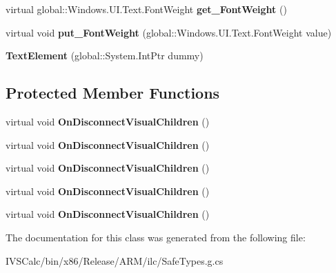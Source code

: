 \begin{DoxyCompactItemize}
virtual global\+::\+Windows.\+U\+I.\+Text.\+Font\+Weight {\bfseries get\+\_\+\+Font\+Weight} ()
\item 
\mbox{\label{class_windows_1_1_u_i_1_1_xaml_1_1_documents_1_1_text_element_ad99e56ff2f90ee72234321c2ba23b1e5}} 
virtual void {\bfseries put\+\_\+\+Font\+Weight} (global\+::\+Windows.\+U\+I.\+Text.\+Font\+Weight value)
\item 
\mbox{\label{class_windows_1_1_u_i_1_1_xaml_1_1_documents_1_1_text_element_a434a1629decb82d8f5a91fbca43cac71}} 
{\bfseries Text\+Element} (global\+::\+System.\+Int\+Ptr dummy)
\end{DoxyCompactItemize}
\subsection*{Protected Member Functions}
\begin{DoxyCompactItemize}
\item 
\mbox{\label{class_windows_1_1_u_i_1_1_xaml_1_1_documents_1_1_text_element_ae0966a3fbd52b313f28f0ceab752a6b4}} 
virtual void {\bfseries On\+Disconnect\+Visual\+Children} ()
\item 
\mbox{\label{class_windows_1_1_u_i_1_1_xaml_1_1_documents_1_1_text_element_ae0966a3fbd52b313f28f0ceab752a6b4}} 
virtual void {\bfseries On\+Disconnect\+Visual\+Children} ()
\item 
\mbox{\label{class_windows_1_1_u_i_1_1_xaml_1_1_documents_1_1_text_element_ae0966a3fbd52b313f28f0ceab752a6b4}} 
virtual void {\bfseries On\+Disconnect\+Visual\+Children} ()
\item 
\mbox{\label{class_windows_1_1_u_i_1_1_xaml_1_1_documents_1_1_text_element_ae0966a3fbd52b313f28f0ceab752a6b4}} 
virtual void {\bfseries On\+Disconnect\+Visual\+Children} ()
\item 
\mbox{\label{class_windows_1_1_u_i_1_1_xaml_1_1_documents_1_1_text_element_ae0966a3fbd52b313f28f0ceab752a6b4}} 
virtual void {\bfseries On\+Disconnect\+Visual\+Children} ()
\end{DoxyCompactItemize}


The documentation for this class was generated from the following file\+:\begin{DoxyCompactItemize}
\item 
I\+V\+S\+Calc/bin/x86/\+Release/\+A\+R\+M/ilc/Safe\+Types.\+g.\+cs\end{DoxyCompactItemize}
